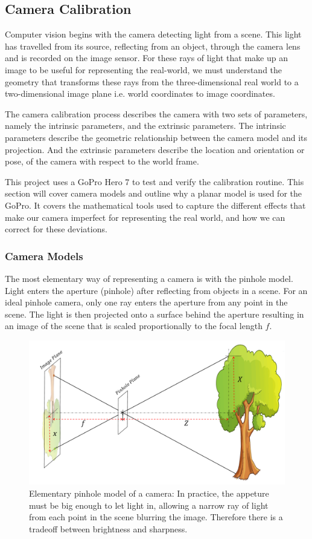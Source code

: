 \documentclass{UoNMCHA}
\numberwithin{equation}{section}
\begin{document}
\subsection{Camera Calibration}\label{sec:Background_cameraCal} %
Computer vision begins with the camera detecting light from a scene. This light has travelled from its source, reflecting from an object, through the camera lens and is recorded on the image sensor. For these rays of light that make up an image to be useful for representing the real-world, we must understand the geometry that transforms these rays from the three-dimensional real world to a two-dimensional image plane i.e. world coordinates to image coordinates.

The camera calibration process describes the camera with two sets of parameters, namely the intrinsic parameters, and the extrinsic parameters. The intrinsic parameters describe the geometric relationship between the camera model and its projection. And the extrinsic parameters describe the location and orientation or pose, of the camera with respect to the world frame.

This project uses a GoPro Hero 7 to test and verify the calibration routine. This section will cover camera models and outline why a planar model is used for the GoPro. It covers the mathematical tools used to capture the different effects that make our camera imperfect for representing the real world, and how we can correct for these deviations.
\subsubsection{Camera Models}
The most elementary way of representing a camera is with the pinhole model. Light enters the aperture (pinhole) after reflecting from objects in a scene. For an ideal pinhole camera, only one ray enters the aperture from any point in the scene. The light is then projected onto a surface behind the aperture resulting in an image of the scene that is scaled proportionally to the focal length $f$.

\begin{figure}[ht]
    \begin{center}
        \includegraphics[width=.8\linewidth]{Figures/Pinhole_model}
        \caption{Elementary pinhole model of a camera: In practice, the appeture must be big enough to let light in, allowing a narrow ray of light from each point in the scene blurring the image. Therefore there is a tradeoff between brightness and sharpness.}
        \label{fig:PinholeModel}
    \end{center}
\end{figure}
\end{document}
